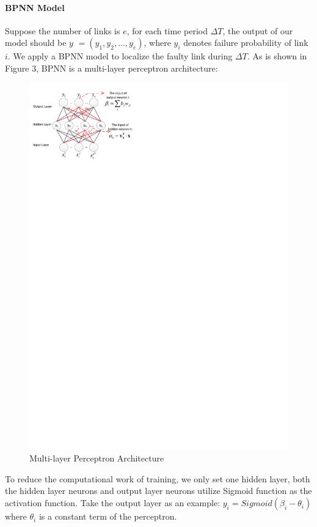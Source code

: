 \documentclass{sig-alternate-05-2015}
\begin{document}
\paragraph{BPNN Model}
Suppose the number of links is $e$, for each time period $\Delta T$, the output of our model should be
\boldmath $y$
\unboldmath $=(y_1, y_2, ..., y_e)$, where $y_i$ denotes failure probability of link $i$. We apply a BPNN model to localize the faulty link during $\Delta T$. As is shown in Figure 3, BPNN is a multi-layer perceptron architecture:
\begin{figure}
  \centering
  \includegraphics{ANN}
  \caption{Multi-layer Perceptron Architecture}
\end{figure}
To reduce the computational work of training, we only set one hidden layer, both the hidden layer neurons and output layer neurons utilize Sigmoid function as the activation function. Take the output layer as an example:
$y_i = Sigmoid(\beta_i - \theta_i)$ where $\theta_i$ is a constant term of the perceptron.
\end{document}
